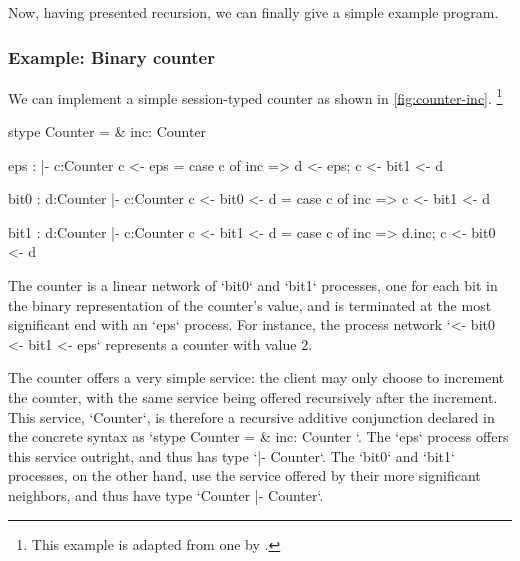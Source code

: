 Now, having presented recursion, we can finally give a simple example program.


\subsubsection{Example: Binary counter}\label{sec:exampl-binary-count}

We can implement a simple session-typed counter as shown in \cref{fig:counter-inc}.%
\footnote{This example is adapted from one by \textcite{Toninho+:ESOP13}.}
%
  \begin{sillcode}[
    caption={A simple binary counter supporting an increment operation},%
    label={fig:counter-inc},%
    gobble=4
  ]
    stype Counter = &{ inc: Counter }
    
    eps : {|- c:Counter}
    c <- eps =
    { case c of
        inc => d <- eps;
               c <- bit1 <- d }
    
    bit0 : {d:Counter |- c:Counter}
    c <- bit0 <- d =
    { case c of
        inc => c <- bit1 <- d }
    
    bit1 : {d:Counter |- c:Counter}
    c <- bit1 <- d =
    { case c of
        inc => d.inc;
               c <- bit0 <- d }
  \end{sillcode}
%
The counter is a linear network of \msill`bit0` and \msill`bit1` processes, one for each bit in the binary representation of the counter's value, and is terminated at the most significant end with an \msill`eps` process.
For instance, the process network \msill`<- bit0 <- bit1 <- eps` represents a counter with value $2$.

The counter offers a very simple service: the client may only choose to increment the counter, with the same service being offered recursively after the increment.
This service, \msill`Counter`, is therefore a recursive additive conjunction
declared in the concrete syntax as \msill`stype Counter = &{ inc: Counter }`.
The \msill`eps` process offers this service outright, and thus has type \msill`{|- Counter}`.
The \msill`bit0` and \msill`bit1` processes, on the other hand, use the service offered by their more significant neighbors, and thus have type \msill`{Counter |- Counter}`.

